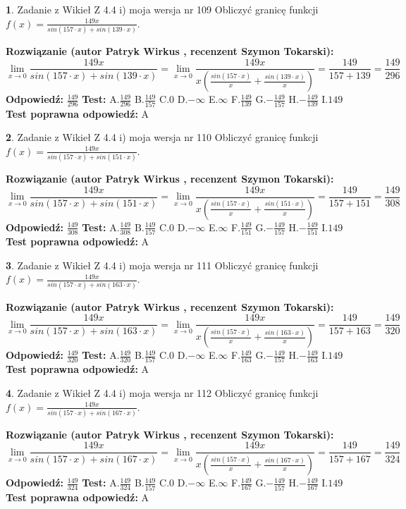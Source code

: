 \documentclass[12pt, a4paper]{article}
\theoremstyle{definition} %
\newtheorem{zad}{}
\newcommand{\zadStart}[1]{\begin{zad}#1\newline}
\newcommand{\zadStop}{\end{zad}}
\newcommand{\rozwStart}[2]{\noindent \textbf{Rozwiązanie (autor #1 , recenzent #2): }\newline}
\newcommand{\rozwStop}{\newline}
\newcommand{\odpStart}{\noindent \textbf{Odpowiedź:}\newline}
\newcommand{\odpStop}{\newline}
\newcommand{\testStart}{\noindent \textbf{Test:}\newline}
\newcommand{\testStop}{\newline}
\newcommand{\kluczStart}{\noindent \textbf{Test poprawna odpowiedź:}\newline}
\newcommand{\kluczStop}{\newline}
\begin{document}
\zadStart{Zadanie z Wikieł Z 4.4 i) moja wersja nr 109}
Obliczyć granicę funkcji $f(x)=\frac{149x}{sin(157\cdot x) +sin(139\cdot x)}$.
\zadStop
\rozwStart{Patryk Wirkus}{Szymon Tokarski}
$$\lim\limits_{x\to 0}\frac{149x}{sin(157\cdot x) +sin(139\cdot x)}=\lim\limits_{x\to 0}\frac{149x}{x(\frac{sin(157\cdot x)}{x}+\frac{sin(139\cdot x)}{x})}=\frac{149}{157+139} = \frac{149}{296}$$
\rozwStop
\odpStart
$\frac{149}{296}$
\odpStop
\testStart
A.$\frac{149}{296}$
B.$\frac{149}{157}$
C.$0$
D.$-\infty$
E.$\infty$
F.$\frac{149}{139}$
G.$-\frac{149}{157}$
H.$-\frac{149}{139}$
I.$149$
\testStop
\kluczStart
A
\kluczStop



\zadStart{Zadanie z Wikieł Z 4.4 i) moja wersja nr 110}
Obliczyć granicę funkcji $f(x)=\frac{149x}{sin(157\cdot x) +sin(151\cdot x)}$.
\zadStop
\rozwStart{Patryk Wirkus}{Szymon Tokarski}
$$\lim\limits_{x\to 0}\frac{149x}{sin(157\cdot x) +sin(151\cdot x)}=\lim\limits_{x\to 0}\frac{149x}{x(\frac{sin(157\cdot x)}{x}+\frac{sin(151\cdot x)}{x})}=\frac{149}{157+151} = \frac{149}{308}$$
\rozwStop
\odpStart
$\frac{149}{308}$
\odpStop
\testStart
A.$\frac{149}{308}$
B.$\frac{149}{157}$
C.$0$
D.$-\infty$
E.$\infty$
F.$\frac{149}{151}$
G.$-\frac{149}{157}$
H.$-\frac{149}{151}$
I.$149$
\testStop
\kluczStart
A
\kluczStop



\zadStart{Zadanie z Wikieł Z 4.4 i) moja wersja nr 111}
Obliczyć granicę funkcji $f(x)=\frac{149x}{sin(157\cdot x) +sin(163\cdot x)}$.
\zadStop
\rozwStart{Patryk Wirkus}{Szymon Tokarski}
$$\lim\limits_{x\to 0}\frac{149x}{sin(157\cdot x) +sin(163\cdot x)}=\lim\limits_{x\to 0}\frac{149x}{x(\frac{sin(157\cdot x)}{x}+\frac{sin(163\cdot x)}{x})}=\frac{149}{157+163} = \frac{149}{320}$$
\rozwStop
\odpStart
$\frac{149}{320}$
\odpStop
\testStart
A.$\frac{149}{320}$
B.$\frac{149}{157}$
C.$0$
D.$-\infty$
E.$\infty$
F.$\frac{149}{163}$
G.$-\frac{149}{157}$
H.$-\frac{149}{163}$
I.$149$
\testStop
\kluczStart
A
\kluczStop



\zadStart{Zadanie z Wikieł Z 4.4 i) moja wersja nr 112}
Obliczyć granicę funkcji $f(x)=\frac{149x}{sin(157\cdot x) +sin(167\cdot x)}$.
\zadStop
\rozwStart{Patryk Wirkus}{Szymon Tokarski}
$$\lim\limits_{x\to 0}\frac{149x}{sin(157\cdot x) +sin(167\cdot x)}=\lim\limits_{x\to 0}\frac{149x}{x(\frac{sin(157\cdot x)}{x}+\frac{sin(167\cdot x)}{x})}=\frac{149}{157+167} = \frac{149}{324}$$
\rozwStop
\odpStart
$\frac{149}{324}$
\odpStop
\testStart
A.$\frac{149}{324}$
B.$\frac{149}{157}$
C.$0$
D.$-\infty$
E.$\infty$
F.$\frac{149}{167}$
G.$-\frac{149}{157}$
H.$-\frac{149}{167}$
I.$149$
\testStop
\kluczStart
A
\kluczStop
\end{document}

